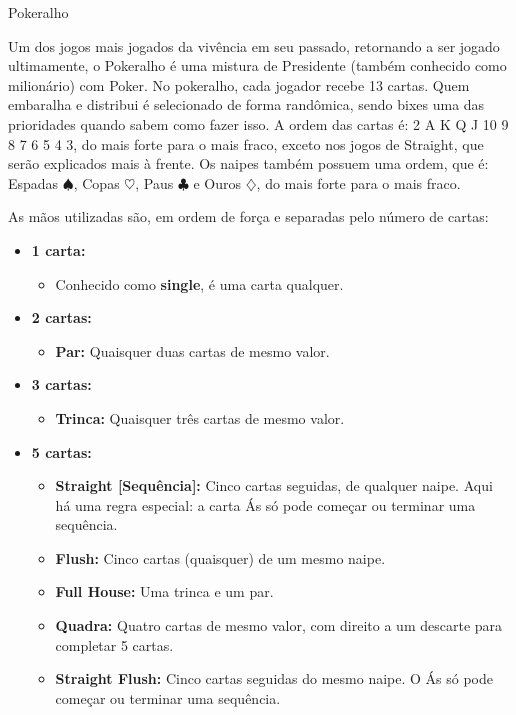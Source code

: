 \begin{subsecao}{Pokeralho}

Um dos jogos mais jogados da vivência em seu passado, retornando a ser jogado ultimamente, o
Pokeralho é uma mistura de Presidente (também conhecido como milionário) com
Poker. No pokeralho, cada jogador recebe 13 cartas. Quem embaralha e distribui é
selecionado de forma randômica, sendo bixes uma das prioridades quando sabem
como fazer isso. A ordem das cartas é: 2 A K Q J 10 9 8 7 6 5 4 3, do mais forte
para o mais fraco, exceto nos jogos de Straight, que serão explicados mais à
frente. Os naipes também possuem uma ordem, que é: Espadas $\spadesuit$, Copas $\heartsuit$,
Paus $\clubsuit$ e Ouros $\diamondsuit$, do mais forte para o mais fraco.

As mãos utilizadas são, em ordem de força e separadas pelo número de cartas:

\begin{itemize}

\item \textbf {1 carta:}
\begin{itemize}
\item Conhecido como \textbf{single}, é uma carta qualquer.
\end{itemize}
\item \textbf {2 cartas:}
\begin{itemize}

\item \textbf{Par:} Quaisquer duas cartas de mesmo valor.
\end{itemize}
\item \textbf {3 cartas:}

\begin{itemize}
\item \textbf{Trinca:} Quaisquer três cartas de mesmo valor.
\end{itemize}
\item \textbf {5 cartas:}

\begin{itemize}
\item \textbf{Straight [Sequência]:} Cinco cartas seguidas, de qualquer naipe.
Aqui há uma regra especial: a carta Ás só pode começar ou terminar uma
sequência.
\item \textbf{Flush:} Cinco cartas (quaisquer) de um mesmo naipe.
\item \textbf{Full House:} Uma trinca e um par.
\item \textbf{Quadra:} Quatro cartas de mesmo valor, com direito a um descarte
para completar 5 cartas.
\item \textbf{Straight Flush:} Cinco cartas seguidas do mesmo naipe. O Ás só
pode começar ou terminar uma sequência. 
\end{itemize}


\end{itemize}
\end{subsecao}
